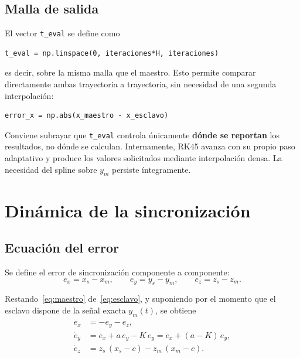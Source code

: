 \documentclass[12pt,a4paper]{article}
\begin{document}
\subsection{Malla de salida}

El vector \texttt{t\_eval} se define como
\begin{lstlisting}
t_eval = np.linspace(0, iteraciones*H, iteraciones)
\end{lstlisting}
es decir, sobre la misma malla que el maestro. Esto permite comparar directamente ambas trayectoria a trayectoria, sin necesidad de una segunda interpolación:
\begin{lstlisting}
error_x = np.abs(x_maestro - x_esclavo)
\end{lstlisting}

Conviene subrayar que \texttt{t\_eval} controla únicamente \textbf{dónde se reportan} los resultados, no dónde se calculan. Internamente, RK45 avanza con su propio paso adaptativo y produce los valores solicitados mediante interpolación densa. La necesidad del spline sobre $y_m$ persiste íntegramente.

\section{Dinámica de la sincronización}

\subsection{Ecuación del error}

Se define el error de sincronización componente a componente:
\begin{equation}
e_x = x_s - x_m, \qquad e_y = y_s - y_m, \qquad e_z = z_s - z_m.
\end{equation}

Restando~\eqref{eq:maestro} de~\eqref{eq:esclavo}, y suponiendo por el momento que el esclavo dispone de la señal exacta $y_m(t)$, se obtiene
\begin{equation}
\begin{aligned}
\dot{e}_x &= -e_y - e_z,\\
\dot{e}_y &= e_x + a\,e_y - K\,e_y = e_x + (a - K)\,e_y,\\
\dot{e}_z &= z_s\,(x_s - c) - z_m\,(x_m - c).
\end{aligned}
\label{eq:error}
\end{equation}
\end{document}

